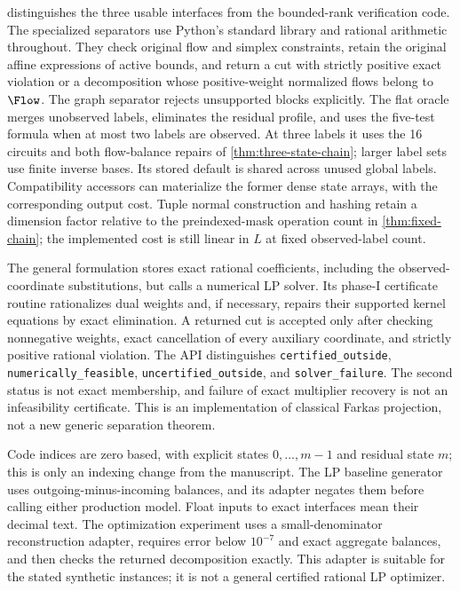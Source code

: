  distinguishes the three usable interfaces
from the bounded-rank verification code. The specialized separators use
Python's standard library and rational arithmetic throughout. They check
original flow and simplex constraints, retain the original affine expressions
of active bounds, and return a cut with strictly positive exact violation
or a decomposition whose positive-weight normalized flows belong to $\Flow$.
The graph separator rejects unsupported blocks explicitly. The flat oracle
merges unobserved labels, eliminates the residual profile, and uses the
five-test formula when at most two labels are observed. At three labels it
uses the 16 circuits and both flow-balance repairs of
\cref{thm:three-state-chain}; larger label sets use finite inverse bases.
Its stored default is shared across unused global labels. Compatibility
accessors can materialize the former dense state arrays, with the corresponding
output cost. Tuple normal construction and hashing retain a dimension factor
relative to the preindexed-mask operation count in \cref{thm:fixed-chain};
the implemented cost is still linear in $L$ at fixed observed-label count.

The general formulation stores exact rational coefficients, including the
observed-coordinate substitutions, but calls a numerical LP solver.
Its phase-I certificate routine rationalizes dual weights and, if necessary,
repairs their supported kernel equations by exact elimination. A returned
cut is accepted only after checking nonnegative weights, exact cancellation
of every auxiliary coordinate, and strictly positive rational violation.
The API distinguishes \texttt{certified\_outside},
\texttt{numerically\_feasible}, \texttt{uncertified\_outside}, and
\texttt{solver\_failure}. The second status is not exact membership,
and failure of exact multiplier recovery is not an infeasibility certificate.
This is an implementation of classical Farkas projection, not a new generic
separation theorem.

Code indices are zero based, with explicit states $0,\ldots,m-1$ and
residual state $m$; this is only an indexing change from the manuscript.
The LP baseline generator uses outgoing-minus-incoming balances, and its
adapter negates them before calling either production model. Float inputs
to exact interfaces mean their decimal text. The optimization experiment
uses a small-denominator reconstruction adapter, requires error below
$10^{-7}$ and exact aggregate balances, and then checks the returned
decomposition exactly. This adapter is suitable for the stated synthetic
instances; it is not a general certified rational LP optimizer.

